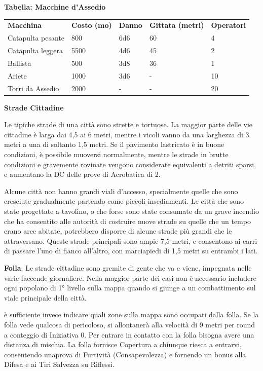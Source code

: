 \documentclass[a4paper,11pt,twoside,openany]{book}
\begin{document}
\bigskip

\textbf{Tabella: Macchine d'Assedio}

\medskip

\begin{tabularx}{0.95\textwidth}{XXXXX}
	\toprule
	\textbf{Macchina} & \textbf{Costo (mo)} & \textbf{Danno} & \textbf{Gittata (metri)} & \textbf{Operatori}\\
	Catapulta pesante & 800  & 6d6  & 60   & 4\\
	Catapulta leggera & 5500 & 4d6  & 45   & 2\\
	Ballista& 500  & 3d8  & 36   & 1\\
	Ariete  & 1000 & 3d6  & -    & 10\\
	Torri da Assedio  & 2000 & -    & -    & 20\\
\end{tabularx}

\bigskip

\textbf{Strade Cittadine}

Le tipiche strade di una città sono strette e tortuose. La maggior parte delle vie cittadine è larga dai 4,5 ai 6 metri, mentre i vicoli vanno da una larghezza di 3 metri a una di soltanto 1,5 metri. Se il pavimento lastricato è in buone condizioni, è possibile muoversi normalmente, mentre le strade in brutte condizioni e gravemente rovinate vengono considerate equivalenti a detriti sparsi, e aumentano la DC delle prove di Acrobatica di 2.

Alcune città non hanno grandi viali d'accesso, specialmente quelle che sono cresciute gradualmente partendo come piccoli insediamenti. Le città che sono state progettate a tavolino, o che forse sono state consumate da un grave incendio che ha consentito alle autorità di costruire nuove strade su quelle che un tempo erano aree abitate, potrebbero disporre di alcune strade più grandi che le attraversano. Queste strade principali sono ampie 7,5 metri, e consentono ai carri di passare l'uno di fianco all'altro, con marciapiedi di 1,5 metri su entrambi i lati.

\textbf{Folla}: Le strade cittadine sono gremite di gente che va e viene, impegnata nelle varie faccende giornaliere. Nella maggior parte dei casi non è necessario includere ogni popolano di 1° livello sulla mappa quando si giunge a un combattimento sul viale principale della città.

è sufficiente invece indicare quali zone sulla mappa sono occupati dalla folla. Se la folla vede qualcosa di pericoloso, si allontanerà alla velocità di 9 metri per round a conteggio di Iniziativa 0. Per entrare in contatto con la folla bisogna avere una distanza di mischia. La folla fornisce Copertura a chiunque riesca a entrarvi, consentendo unaprova di Furtività (Consapevolezza) e fornendo un bonus alla Difesa e ai Tiri Salvezza su Riflessi.
\end{document}
